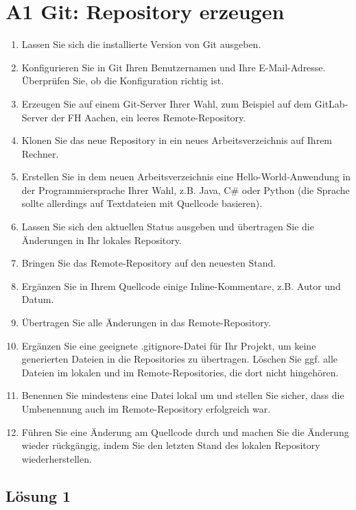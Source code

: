 \documentclass[main.tex]{subfiles}
\begin{document}
\section{A1 Git: Repository erzeugen}

\renewcommand{\labelenumi}{\arabic{enumi}.}
\begin{enumerate}
\item  Lassen Sie sich die installierte Version von Git ausgeben.
\item  Konfigurieren Sie in Git Ihren Benutzernamen und Ihre E-Mail-Adresse. Überprüfen Sie, ob die Konfiguration richtig ist.
\item  Erzeugen Sie auf einem Git-Server Ihrer Wahl, zum Beispiel auf dem GitLab-Server der FH Aachen, ein leeres Remote-Repository.
\item  Klonen Sie das neue Repository in ein neues Arbeitsverzeichnis auf Ihrem Rechner.
\item  Erstellen Sie in dem neuen Arbeitsverzeichnis eine Hello-World-Anwendung in der Programmiersprache Ihrer Wahl, z.B. Java, C\# oder Python (die Sprache sollte allerdings auf Textdateien mit Quellcode basieren).
\item  Lassen Sie sich den aktuellen Status ausgeben und übertragen Sie die Änderungen in Ihr lokales Repository.
\item  Bringen Sie das Remote-Repository auf den neuesten Stand.
\item  Ergänzen Sie in Ihrem Quellcode einige Inline-Kommentare, z.B. Autor und Datum.
\item  Übertragen Sie alle Änderungen in das Remote-Repository.
\item  Ergänzen Sie eine geeignete .gitignore-Datei für Ihr Projekt, um keine generierten Dateien in die Repositories zu übertragen. Löschen Sie ggf. alle Dateien im lokalen und im Remote-Repositories, die dort nicht hingehören.
\item  Benennen Sie mindestens eine Datei lokal um und stellen Sie sicher, dass die Umbenennung auch im Remote-Repository erfolgreich war.
\item  Führen Sie eine Änderung am Quellcode durch und machen Sie die Änderung wieder rückgängig, indem Sie den letzten Stand des lokalen Repository wiederherstellen.
\end{enumerate}

\subsection{Lösung 1}
\end{document}
